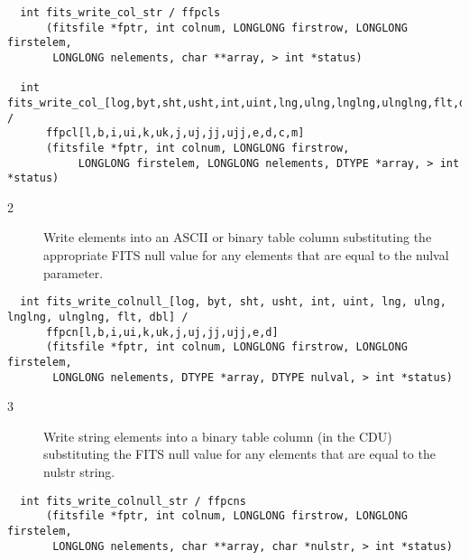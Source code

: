\documentclass[11pt]{book}
\begin{document}
\begin{verbatim}
  int fits_write_col_str / ffpcls
      (fitsfile *fptr, int colnum, LONGLONG firstrow, LONGLONG firstelem,
       LONGLONG nelements, char **array, > int *status)

  int fits_write_col_[log,byt,sht,usht,int,uint,lng,ulng,lnglng,ulnglng,flt,dbl,cmp,dblcmp] /
      ffpcl[l,b,i,ui,k,uk,j,uj,jj,ujj,e,d,c,m]
      (fitsfile *fptr, int colnum, LONGLONG firstrow,
           LONGLONG firstelem, LONGLONG nelements, DTYPE *array, > int *status)
\end{verbatim}

\begin{description}
\item[2 ] Write elements into an ASCII or binary table column
    substituting the appropriate FITS null value for any elements that
    are equal to the nulval parameter.    \label{ffpcnx}
\end{description}

\begin{verbatim}
  int fits_write_colnull_[log, byt, sht, usht, int, uint, lng, ulng, lnglng, ulnglng, flt, dbl] /
      ffpcn[l,b,i,ui,k,uk,j,uj,jj,ujj,e,d]
      (fitsfile *fptr, int colnum, LONGLONG firstrow, LONGLONG firstelem,
       LONGLONG nelements, DTYPE *array, DTYPE nulval, > int *status)
\end{verbatim}

\begin{description}
\item[3 ] Write string elements into a binary table column (in the CDU)
    substituting the FITS null value for any elements that
   are equal to the nulstr string.  \label{ffpcns}
\end{description}

\begin{verbatim}
  int fits_write_colnull_str / ffpcns
      (fitsfile *fptr, int colnum, LONGLONG firstrow, LONGLONG firstelem,
       LONGLONG nelements, char **array, char *nulstr, > int *status)
\end{verbatim}
\end{document}
